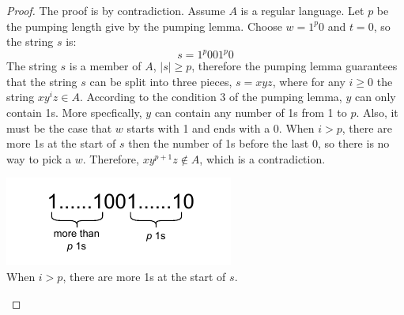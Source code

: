 \documentclass[11pt]{article}
\begin{document}
\begin{proof}
The proof is by contradiction. Assume $A$ is a regular language. Let $p$ be the pumping length give by the pumping lemma. Choose $w = 1^{p}0$ and $t=0$, so the string $s$ is:
\[ s = 1^{p}001^{p}0 \]
The string $s$ is a member of $A$, $|s| \geq p$, therefore the pumping lemma guarantees that the string $s$ can be split into three pieces, $s=xyz$, where for any $i \geq 0$ the string $xy^{i}z \in A$. According to the condition 3 of the pumping lemma, $y$ can only contain 1s. More specfically, $y$ can contain any number of 1s from 1 to $p$. Also, it must be the case that $w$ starts with 1 and ends with a 0. When $i > p$, there are more 1s at the start of $s$ then the number of 1s before the last 0, so there is no way to pick a $w$. Therefore, $xy^{p+1}z \notin A$, which is a contradiction.
\begin{center}
\includegraphics[scale=2.0]{Figures/Problem1.46.pdf} \\
When $i > p$, there are more 1s at the start of $s$.
\end{center}
\end{proof}
\end{document}
